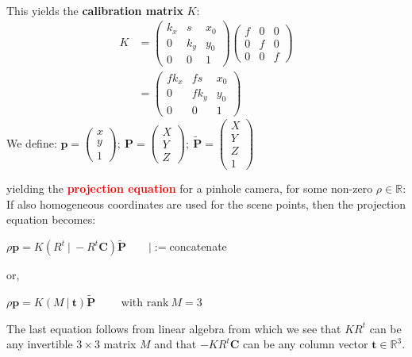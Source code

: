 \documentclass[a4paper, fontsize=8pt, landscape, DIV=1]{scrartcl}
\begin{document}
\begin{multicols*}{4}
\begin{align*}
		\end{align*}
		This yields the \textbf{calibration matrix} $K$:
		\begin{align*}
			K&=\begin{pmatrix}k_x&s&x_0\\0&k_y&y_0\\0&0&1\end{pmatrix}\begin{pmatrix}f&0&0\\0&f&0\\0&0&f\end{pmatrix}\\
			 &=\begin{pmatrix}fk_x&fs&x_0\\0&fk_y&y_0\\0&0&1\end{pmatrix}
		\end{align*}
		We define: $\mathbf{p}=\begin{pmatrix}x\\y\\1\end{pmatrix};\ \mathbf{P}=\begin{pmatrix}X\\Y\\Z\end{pmatrix};\ 
					\mathbf{\tilde{P}}=\begin{pmatrix}X\\Y\\Z\\1\end{pmatrix}$
		\par 
		yielding the \textcolor{red}{\textbf{projection equation}} for a pinhole camera, for some non-zero $\rho\in\mathbb{R}$: 
		\ceqbox{\rho\mathbf{p}=KR^t\left(\mathbf{P}-\mathbf{C}\right)}
		If also homogeneous coordinates are used for the scene points, then the projection equation becomes: 
		\par 
		\hspace{0.3cm}$\rho\mathbf{p}=K\left(R^t\ \vert\ -R^t\mathbf{C}\right)\mathbf{\tilde{P}}\qquad\vert:=$concatenate
		\par 
		or,
		\par 
		\hspace{0.3cm}$\rho\mathbf{p}=K\left(M\ \vert\ \mathbf{t}\right)\mathbf{\tilde{P}}\qquad$ with $\text{rank} \ M = 3$
		\par 
		The last equation follows from linear algebra from which we see that $KR^t$ can be any invertible $3\times3$ matrix $M$
		and that $-KR^t\mathbf{C}$ can be any column vector $\mathbf{t}\in\mathbb{R}^3$.
		\par 
		\vfill\null
		\columnbreak
		

\end{multicols*}
\end{document}
